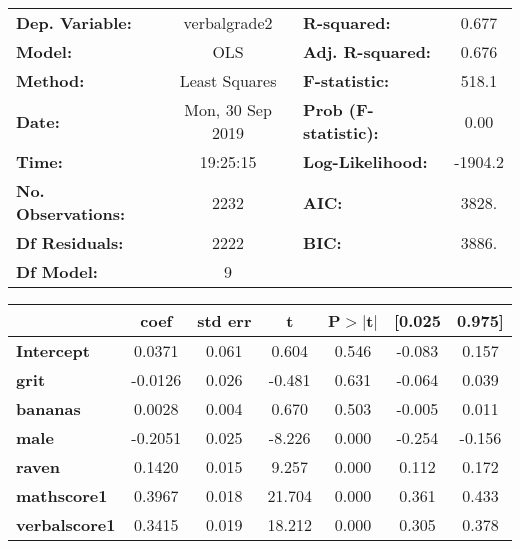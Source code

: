 \documentclass{report}
\begin{document}
\begin{center}
\begin{tabular}{lclc}
\toprule
\textbf{Dep. Variable:}    &   verbalgrade2   & \textbf{  R-squared:         } &     0.677   \\
\textbf{Model:}            &       OLS        & \textbf{  Adj. R-squared:    } &     0.676   \\
\textbf{Method:}           &  Least Squares   & \textbf{  F-statistic:       } &     518.1   \\
\textbf{Date:}             & Mon, 30 Sep 2019 & \textbf{  Prob (F-statistic):} &     0.00    \\
\textbf{Time:}             &     19:25:15     & \textbf{  Log-Likelihood:    } &   -1904.2   \\
\textbf{No. Observations:} &        2232      & \textbf{  AIC:               } &     3828.   \\
\textbf{Df Residuals:}     &        2222      & \textbf{  BIC:               } &     3886.   \\
\textbf{Df Model:}         &           9      & \textbf{                     } &             \\
\bottomrule
\end{tabular}
\begin{tabular}{lcccccc}
                         & \textbf{coef} & \textbf{std err} & \textbf{t} & \textbf{P$> |$t$|$} & \textbf{[0.025} & \textbf{0.975]}  \\
\midrule
\textbf{Intercept}       &       0.0371  &        0.061     &     0.604  &         0.546        &       -0.083    &        0.157     \\
\textbf{grit}            &      -0.0126  &        0.026     &    -0.481  &         0.631        &       -0.064    &        0.039     \\
\textbf{bananas}         &       0.0028  &        0.004     &     0.670  &         0.503        &       -0.005    &        0.011     \\
\textbf{male}            &      -0.2051  &        0.025     &    -8.226  &         0.000        &       -0.254    &       -0.156     \\
\textbf{raven}           &       0.1420  &        0.015     &     9.257  &         0.000        &        0.112    &        0.172     \\
\textbf{mathscore1}      &       0.3967  &        0.018     &    21.704  &         0.000        &        0.361    &        0.433     \\
\textbf{verbalscore1}    &       0.3415  &        0.019     &    18.212  &         0.000        &        0.305    &        0.378     \\

\end{tabular}
\end{center}
\end{document}

